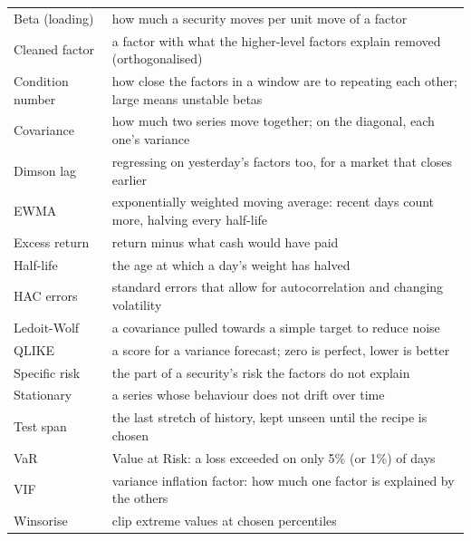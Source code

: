 \documentclass[11pt,a4paper]{article}
\begin{document}
\begin{tabularx}{\linewidth}{@{}lX@{}}
\toprule
Beta (loading) & how much a security moves per unit move of a factor \\
Cleaned factor & a factor with what the higher-level factors explain removed (orthogonalised) \\
Condition number & how close the factors in a window are to repeating each other; large means unstable betas \\
Covariance & how much two series move together; on the diagonal, each one's variance \\
Dimson lag & regressing on yesterday's factors too, for a market that closes earlier \\
EWMA & exponentially weighted moving average: recent days count more, halving every half-life \\
Excess return & return minus what cash would have paid \\
Half-life & the age at which a day's weight has halved \\
HAC errors & standard errors that allow for autocorrelation and changing volatility \\
Ledoit-Wolf & a covariance pulled towards a simple target to reduce noise \\
QLIKE & a score for a variance forecast; zero is perfect, lower is better \\
Specific risk & the part of a security's risk the factors do not explain \\
Stationary & a series whose behaviour does not drift over time \\
Test span & the last stretch of history, kept unseen until the recipe is chosen \\
VaR & Value at Risk: a loss exceeded on only 5\% (or 1\%) of days \\
VIF & variance inflation factor: how much one factor is explained by the others \\
Winsorise & clip extreme values at chosen percentiles \\
\bottomrule
\end{tabularx}
\end{document}
